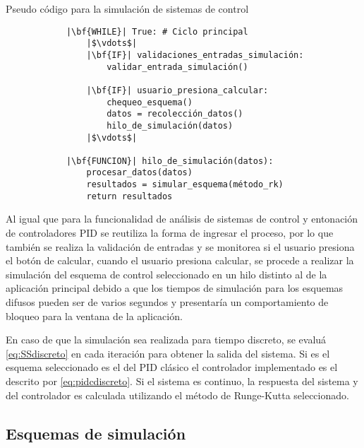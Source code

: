     \begin{longlisting}
        \caption[Pseudo código - Simulación de sistemas de control]{Pseudo código para la simulación de sistemas de control}
        \label{code:simulacion}				
        \begin{verbatim}
            |\bf{WHILE}| True: # Ciclo principal
                |$\vdots$|
                |\bf{IF}| validaciones_entradas_simulación:
                    validar_entrada_simulación()
                
                |\bf{IF}| usuario_presiona_calcular:
                    chequeo_esquema()
                    datos = recolección_datos()
                    hilo_de_simulación(datos)
                |$\vdots$|
            
            |\bf{FUNCION}| hilo_de_simulación(datos):
                procesar_datos(datos)
                resultados = simular_esquema(método_rk)
                return resultados
        \end{verbatim}
    \end{longlisting}

    Al igual que para la funcionalidad de análisis de sistemas de control y entonación de controladores PID se reutiliza la forma de ingresar el proceso, por lo que también se realiza la validación de entradas y se monitorea si el usuario presiona el botón de calcular, cuando el usuario presiona calcular, se procede a realizar la simulación del esquema de control seleccionado en un hilo distinto al de la aplicación principal debido a que los tiempos de simulación para los esquemas difusos pueden ser de varios segundos y presentaría un comportamiento de bloqueo para la ventana de la aplicación.

    En caso de que la simulación sea realizada para tiempo discreto, se evaluá \cref{eq:SSdiscreto} en cada iteración para obtener la salida del sistema. Si es el esquema seleccionado es el del PID clásico el controlador implementado es el descrito por \cref{eq:pidcdiscreto}. Si el sistema es continuo, la respuesta del sistema y del controlador es calculada utilizando el método de Runge-Kutta seleccionado.

    \subsection{Esquemas de simulación}

